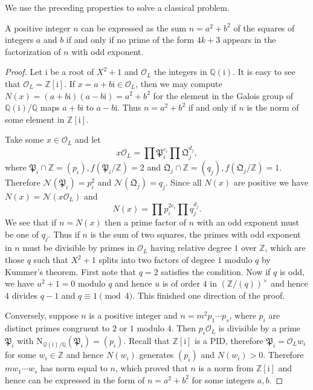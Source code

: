 We use the preceding properties to solve a classical problem.
\begin{theorem}
A positive integer $n$ can be expressed as the sum $n=a^2+b^2$ of the squares of integers $a$ and $b$ if and only if no prime of the form $4k+3$ appears in the factorization of $n$ with odd exponent.
\end{theorem}
\begin{proof}
Let $\mathrm{i}$ be a root of $X^2+1$ and $\mathcal{O}_L$ the integers in $\mathbb{Q}(\mathrm{i})$. It is easy to see that $\mathcal{O}_L=\mathbb{Z}[\mathrm{i}]$. If $x=a+b\mathrm{i}\in\mathcal{O}_L$, then we may compute $N(x)=(a+b\mathrm{i})(a-b\mathrm{i})=a^2+b^2$ for the element in the Galois group of $\mathbb{Q}(\mathrm{i})/\mathbb{Q}$ maps $a+b\mathrm{i}$ to $a-b\mathrm{i}$. Thus $n=a^2+b^2$ if and only if $n$ is the norm of some element in $\mathbb{Z}[\mathrm{i}]$.\par
Take some $x\in\mathcal{O}_L$ and let 
$$
x\mathcal{O} _L=\prod{\mathfrak{P} _{i}^{c_i}}\prod{\mathfrak{Q} _{j}^{d_j}},
$$
where $\mathfrak{P} _i\cap \mathbb{Z} =\left( p_i \right) ,f\left( \mathfrak{P} _i/\mathbb{Z} \right) =2$ and $\mathfrak{Q} _j\cap \mathbb{Z} =\left( q_j \right) ,f\left( \mathfrak{Q} _j/\mathbb{Z} \right) =1$. Therefore $\mathcal{N}(\mathfrak{P}_i)=p_i^2$ and $\mathcal{N}(\mathfrak{Q}_j)=q_j$. Since all $N(x)$ are positive we have $N(x)=\mathcal{N}(x\mathcal{O}_L)$ and 
$$
N\left( x \right) =\prod{p_{i}^{2c_i}}\prod{q_{j}^{d_j}}.
$$
We see that if $n=N(x)$ then a prime factor of $n$ with an odd exponent must be one of $q_j$. Thus if $n$ is the sum of two squares, the primes with odd exponent in $n$ must be divisible by primes in $\mathcal{O}_L$ having relative degree $1$ over $\mathbb{Z}$, which are those $q$ such that $X^2+1$ splits into two factors of degree $1$ modulo $q$ by Kummer's theorem. First note that $q=2$ satisfies the condition. Now if $q$ is odd, we have $u^2+1=0$ modulo $q$ and hence $u$ is of order $4$ in $(\mathbb{Z}/(q))^\times$ and hence $4$ divides $q-1$ and $q\equiv 1\pmod{4}$. This finished one direction of the proof.\par
Conversely, suppose $n$ is a positive integer and $n=m^2p_1\cdots p_s$, where $p_i$ are distinct primes congruent to $2$ or $1$ modulo $4$. Then $p_i\mathcal{O}_L$ is divisible by a prime $\mathfrak{P}_i$ with $\mathrm{N}_{\mathcal{Q}(\mathrm{i})/\mathbb{Q}}(\mathfrak{P}_i)=(p_i)$. Recall that $\mathbb{Z}[\mathrm{i}]$ is a PID, therefore $\mathfrak{P}_i=\mathcal{O}_Lw_i$ for some $w_i\in\mathbb{Z}$ and hence $N(w_i)$ generates $(p_i)$ and $N(w_i)>0$. Therefore $mw_1\cdots w_s$ has norm equal to $n$, which proved that $n$ is a norm from $\mathbb{Z}[\mathrm{i}]$ and hence can be expressed in the form of $n=a^2+b^2$ for some integers $a,b$.
\end{proof}
